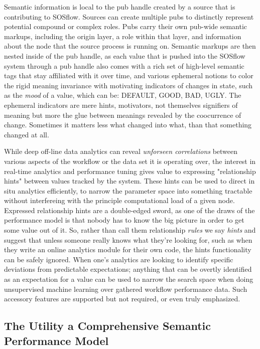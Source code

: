 Semantic information is local to the pub handle created by a source
that is contributing to SOSflow.  Sources can create multiple pubs to
distinctly represent potential compound or complex roles. Pubs carry
their own pub-wide semantic markups, including the origin layer, a
role within that layer, and information about the node that the source
process is running on. Semantic markups are then nested inside of the
pub handle, as each value that is pushed into the SOSflow system
through a pub handle also comes with a rich set of high-level semantic
tags that stay affiliated with it over time, and various ephemeral
notions to color the rigid meaning invariance with motivating indicators
of changes in state, such as the \textit{mood} of a value, which can be:
DEFAULT, GOOD, BAD, UGLY. The ephemeral indicators are mere hints, motivators,
not themselves signifiers of meaning but more the glue between meanings
revealed by the coocurrence of change. Sometimes it matters less what changed
into what, than that something changed at all.

While deep off-line data analytics can reveal \textit{unforseen correlations}
between various aspects of the workflow or the data set it is
operating over, the interest in real-time analytics and performance
tuning gives value to expressing "relationship hints" between values
tracked by the system. These hints can be used to direct in situ
analytics efficiently, to narrow the parameter space into something
tractable without interfereing with the principle computational load of
a given node. Expressed relationship hints are a double-edged sword, as
one of the draws of the performance model is that nobody has to know the
big picture in order to get some value out of it. So, rather than call them
relationship \textit{rules} we say \textit{hints} and suggest that
unless someone really knows what they're looking for, such as when they write
an online analytics module for their own code, the hints functionality
can be safely ignored. When one's analytics are looking to identify
specific deviations from predictable expectations; anything that can
be overtly identified as an expectation for a value can be used to
narrow the search space when doing unsupervised machine learning over
gathered workflow performance data. Such accessory features are supported
but not required, or even truly emphasized.


\subsection{The Utility a Comprehensive Semantic Performance Model}

